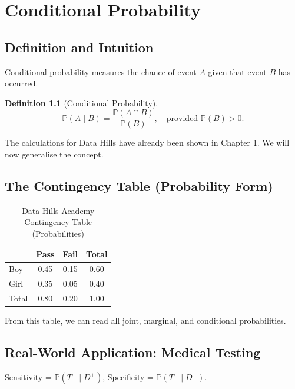 \documentclass[12pt,a4paper,oneside]{report}
\theoremstyle{mytheorem}
\theoremstyle{mydefinition}
\newtheorem{definition}[theorem]{Definition}
\theoremstyle{myremark}
\newcommand{\Prob}{\mathbb{P}}
\begin{document}
\chapter{Conditional Probability}

\section{Definition and Intuition}
Conditional probability measures the chance of event $A$ given that event $B$ has occurred.

\begin{definition}[Conditional Probability]
\[
\Prob(A \mid B) = \frac{\Prob(A \cap B)}{\Prob(B)},\quad \text{provided } \Prob(B) > 0.
\]
\end{definition}

The calculations for Data Hills have already been shown in Chapter 1. We will now generalise the concept.

\section{The Contingency Table (Probability Form)}
\begin{table}[h]
\centering
\caption{Data Hills Academy Contingency Table (Probabilities)}
\begin{tabular}{l|cc|c}
 & Pass & Fail & Total \\
\hline
Boy & 0.45 & 0.15 & 0.60 \\
Girl & 0.35 & 0.05 & 0.40 \\
\hline
Total & 0.80 & 0.20 & 1.00
\end{tabular}
\end{table}

From this table, we can read all joint, marginal, and conditional probabilities.

\section{Real-World Application: Medical Testing}
Sensitivity = $\Prob(T^+ \mid D^+)$, Specificity = $\Prob(T^- \mid D^-)$.
\end{document}
